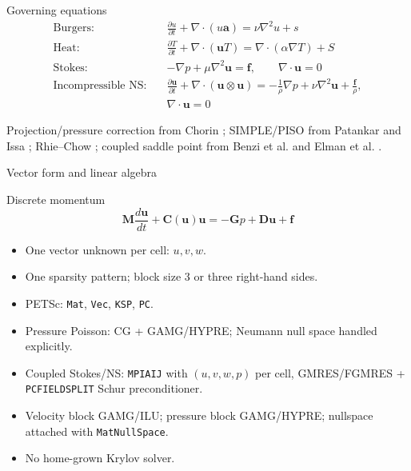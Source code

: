 \documentclass[aspectratio=169,10pt]{beamer}
\begin{document}
\begin{frame}{Governing equations}
  \small
  \begin{align*}
    \text{Burgers:}\quad
    &\frac{\partial u}{\partial t}
      + \nabla\cdot(u\mathbf{a}) = \nu\nabla^2 u + s \\[0.3em]
    \text{Heat:}\quad
    &\frac{\partial T}{\partial t}
      + \nabla\cdot(\mathbf{u}T)
      = \nabla\cdot(\alpha\nabla T) + S \\[0.3em]
    \text{Stokes:}\quad
    &-\nabla p + \mu\nabla^2\mathbf{u} = \mathbf{f},
      \qquad \nabla\cdot\mathbf{u}=0 \\[0.3em]
    \text{Incompressible NS:}\quad
    &\frac{\partial \mathbf{u}}{\partial t}
      + \nabla\cdot(\mathbf{u}\otimes\mathbf{u})
      = -\frac{1}{\rho}\nabla p + \nu\nabla^2\mathbf{u}
      + \frac{\mathbf{f}}{\rho}, \\
    &\nabla\cdot\mathbf{u}=0
  \end{align*}

  \vspace{-0.5em}
  \scriptsize
  Projection/pressure correction from Chorin \cite{chorin1968}; SIMPLE/PISO
  from Patankar \cite{patankar1980} and Issa \cite{issa1986}; Rhie--Chow
  \cite{rhieChow1983}; coupled saddle point from Benzi et al.
  \cite{benzi2005} and Elman et al. \cite{elman2014}.
\end{frame}

\begin{frame}{Vector form and linear algebra}
  \begin{block}{Discrete momentum}
    \[
      \mathbf{M}\frac{d\mathbf{u}}{dt}
      + \mathbf{C}(\mathbf{u})\mathbf{u}
      = -\mathbf{G}p + \mathbf{D}\mathbf{u} + \mathbf{f}
    \]
  \end{block}

  \begin{itemize}
    \item One vector unknown per cell: $u,v,w$.
    \item One sparsity pattern; block size 3 or three right-hand sides.
    \item PETSc: \texttt{Mat}, \texttt{Vec}, \texttt{KSP}, \texttt{PC}.
    \item Pressure Poisson: CG + GAMG/HYPRE; Neumann null space handled
          explicitly.
    \item Coupled Stokes/NS: \texttt{MPIAIJ} with $(u,v,w,p)$ per cell,
          GMRES/FGMRES + \texttt{PCFIELDSPLIT} Schur preconditioner.
    \item Velocity block GAMG/ILU; pressure block GAMG/HYPRE; nullspace
          attached with \texttt{MatNullSpace}.
    \item No home-grown Krylov solver.
  \end{itemize}
\end{frame}
\end{document}

